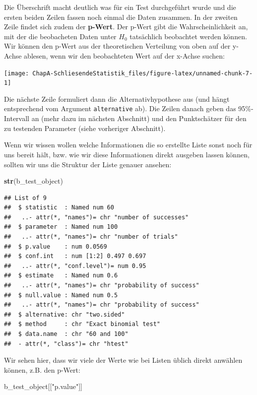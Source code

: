 \documentclass[]{book}
\newenvironment{Shaded}{\begin{snugshade}}{\end{snugshade}}
\newcommand{\KeywordTok}[1]{\textcolor[rgb]{0.13,0.29,0.53}{\textbf{#1}}}
\newcommand{\StringTok}[1]{\textcolor[rgb]{0.31,0.60,0.02}{#1}}
\newcommand{\NormalTok}[1]{#1}
\begin{document}
Die Überschrift macht deutlich was für ein Test durchgeführt wurde und
die ersten beiden Zeilen fassen noch einmal die Daten zusammen. In der
zweiten Zeile findet sich zudem der \textbf{p-Wert}. Der p-Wert gibt die
Wahrscheinlichkeit an, mit der die beobacheten Daten unter \(H_0\)
tatsächlich beobachtet werden können. Wir können den p-Wert aus der
theoretischen Verteilung von oben auf der y-Achse ablesen, wenn wir den
beobachteten Wert auf der x-Achse suchen:

\begin{center}\texttt{[image: ChapA-SchliesendeStatistik\_files/figure-latex/unnamed-chunk-7-1]} \end{center}

Die nächste Zeile formuliert dann die Alternativhypothese aus (und hängt
entsprechend vom Argument \texttt{alternative} ab). Die Zeilen danach
geben das 95\%-Intervall an (mehr dazu im nächsten Abschnitt) und den
Punktschätzer für den zu testenden Parameter (siehe vorheriger
Abschnitt).

Wenn wir wissen wollen welche Informationen die so erstellte Liste sonst
noch für uns bereit hält, bzw. wie wir diese Informationen direkt
ausgeben lassen können, sollten wir uns die Struktur der Liste genauer
ansehen:

\begin{Shaded}
\begin{Highlighting}[]
\KeywordTok{str}\NormalTok{(b_test_object)}
\end{Highlighting}
\end{Shaded}

\begin{verbatim}
## List of 9
##  $ statistic  : Named num 60
##   ..- attr(*, "names")= chr "number of successes"
##  $ parameter  : Named num 100
##   ..- attr(*, "names")= chr "number of trials"
##  $ p.value    : num 0.0569
##  $ conf.int   : num [1:2] 0.497 0.697
##   ..- attr(*, "conf.level")= num 0.95
##  $ estimate   : Named num 0.6
##   ..- attr(*, "names")= chr "probability of success"
##  $ null.value : Named num 0.5
##   ..- attr(*, "names")= chr "probability of success"
##  $ alternative: chr "two.sided"
##  $ method     : chr "Exact binomial test"
##  $ data.name  : chr "60 and 100"
##  - attr(*, "class")= chr "htest"
\end{verbatim}

Wir sehen hier, dass wir viele der Werte wie bei Listen üblich direkt
anwählen können, z.B. den p-Wert:

\begin{Shaded}
\begin{Highlighting}[]
\NormalTok{b_test_object[[}\StringTok{"p.value"}\NormalTok{]]}
\end{Highlighting}
\end{Shaded}
\end{document}
